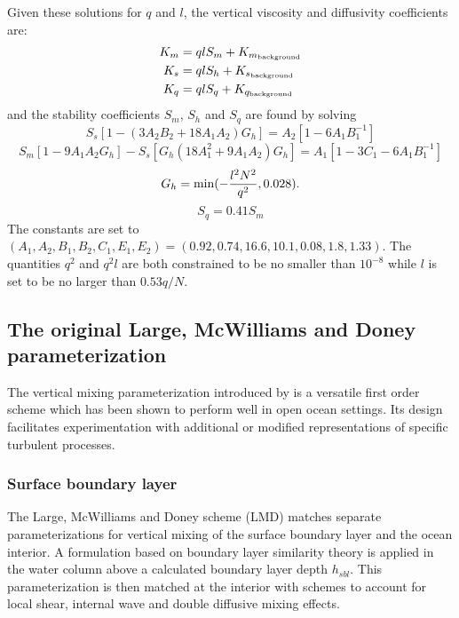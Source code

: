 Given these solutions for $q$ and $l$, the vertical viscosity and
diffusivity coefficients are:
\begin{align}
  K_m &= qlS_m + K_{m_{\rm background}} \\
  K_s &= qlS_h + K_{s_{\rm background}} \\
  K_q &= qlS_q + K_{q_{\rm background}}
\end{align}
and the stability coefficients $S_m$, $S_h$ and $S_q$ are found by
solving
\begin{equation}
  S_s \left[ 1 - (3A_2 B_2 + 18 A_1 A_2) G_h \right] =
  A_2 \left[ 1 - 6A_1 B_1^{-1} \right]
\end{equation}
\begin{equation}
  S_m \left[ 1 - 9A_1 A_2 G_h \right] - S_s \left[ G_h ( 18 A_1^2 +
  9A_1 A_2 ) G_h \right] =
  A_1 \left[ 1 - 3C_1 - 6A_1 B_1^{-1} \right]
\end{equation}
\begin{equation}
  G_h = \min ( -{l^2N^2 \over q^2}, 0.028 ).
\end{equation}
\begin{equation}
  S_q = 0.41 S_m
\end{equation}
The constants are set to $(A_1, A_2, B_1, B_2, C_1, E_1, E_2) = 
(0.92, 0.74, 16.6, 10.1, 0.08, 1.8, 1.33)$. The quantities $q^2$ and
$q^2l$ are both constrained to be no smaller than $10^{-8}$ while $l$
is set to be no larger than $0.53q/N$.
    
\subsection{The original Large, McWilliams and Doney parameterization}
\label{sec:origLMD}

The vertical mixing parameterization introduced by
\cite{Large94} is a versatile first order scheme which has
been shown to perform well in open ocean settings.  Its design
facilitates experimentation with additional or modified representations
of specific turbulent processes.

\subsubsection{Surface boundary layer}
The Large, McWilliams and Doney scheme (LMD)
matches separate parameterizations for vertical mixing
of the surface boundary layer and the ocean interior.  A formulation
based on boundary layer similarity theory is applied in the water
column above a calculated boundary layer depth $h_{sbl}$.  This
parameterization is then matched at the interior with schemes to
account for local shear, internal wave and double diffusive mixing
effects.  

